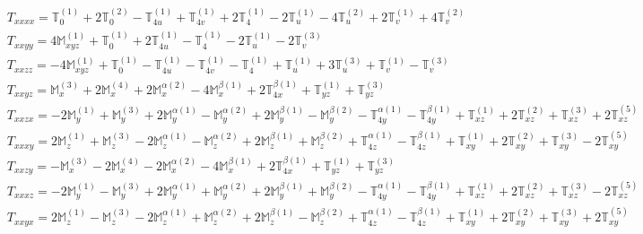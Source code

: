 \documentclass[fleqn,8pt,landscape]{jsarticle}
\begin{document}
\begin{align*}
& T_{xxxx} = \mathbb{T}_{0}^{(1)} + 2 \mathbb{T}_{0}^{(2)} - \mathbb{T}_{4u}^{(1)} + \mathbb{T}_{4v}^{(1)} + 2 \mathbb{T}_{4}^{(1)} - 2 \mathbb{T}_{u}^{(1)} - 4 \mathbb{T}_{u}^{(2)} + 2 \mathbb{T}_{v}^{(1)} + 4 \mathbb{T}_{v}^{(2)} \\
& T_{xxyy} = 4 \mathbb{M}_{xyz}^{(1)} + \mathbb{T}_{0}^{(1)} + 2 \mathbb{T}_{4u}^{(1)} - \mathbb{T}_{4}^{(1)} - 2 \mathbb{T}_{u}^{(1)} - 2 \mathbb{T}_{v}^{(3)} \\
& T_{xxzz} = - 4 \mathbb{M}_{xyz}^{(1)} + \mathbb{T}_{0}^{(1)} - \mathbb{T}_{4u}^{(1)} - \mathbb{T}_{4v}^{(1)} - \mathbb{T}_{4}^{(1)} + \mathbb{T}_{u}^{(1)} + 3 \mathbb{T}_{u}^{(3)} + \mathbb{T}_{v}^{(1)} - \mathbb{T}_{v}^{(3)} \\
& T_{xxyz} = \mathbb{M}_{x}^{(3)} + 2 \mathbb{M}_{x}^{(4)} + 2 \mathbb{M}_{x}^{\alpha(2)} - 4 \mathbb{M}_{x}^{\beta(1)} + 2 \mathbb{T}_{4x}^{\beta(1)} + \mathbb{T}_{yz}^{(1)} + \mathbb{T}_{yz}^{(3)} \\
& T_{xxzx} = - 2 \mathbb{M}_{y}^{(1)} + \mathbb{M}_{y}^{(3)} + 2 \mathbb{M}_{y}^{\alpha(1)} - \mathbb{M}_{y}^{\alpha(2)} + 2 \mathbb{M}_{y}^{\beta(1)} - \mathbb{M}_{y}^{\beta(2)} - \mathbb{T}_{4y}^{\alpha(1)} - \mathbb{T}_{4y}^{\beta(1)} + \mathbb{T}_{xz}^{(1)} + 2 \mathbb{T}_{xz}^{(2)} + \mathbb{T}_{xz}^{(3)} + 2 \mathbb{T}_{xz}^{(5)} \\
& T_{xxxy} = 2 \mathbb{M}_{z}^{(1)} + \mathbb{M}_{z}^{(3)} - 2 \mathbb{M}_{z}^{\alpha(1)} - \mathbb{M}_{z}^{\alpha(2)} + 2 \mathbb{M}_{z}^{\beta(1)} + \mathbb{M}_{z}^{\beta(2)} + \mathbb{T}_{4z}^{\alpha(1)} - \mathbb{T}_{4z}^{\beta(1)} + \mathbb{T}_{xy}^{(1)} + 2 \mathbb{T}_{xy}^{(2)} + \mathbb{T}_{xy}^{(3)} - 2 \mathbb{T}_{xy}^{(5)} \\
& T_{xxzy} = - \mathbb{M}_{x}^{(3)} - 2 \mathbb{M}_{x}^{(4)} - 2 \mathbb{M}_{x}^{\alpha(2)} - 4 \mathbb{M}_{x}^{\beta(1)} + 2 \mathbb{T}_{4x}^{\beta(1)} + \mathbb{T}_{yz}^{(1)} + \mathbb{T}_{yz}^{(3)} \\
& T_{xxxz} = - 2 \mathbb{M}_{y}^{(1)} - \mathbb{M}_{y}^{(3)} + 2 \mathbb{M}_{y}^{\alpha(1)} + \mathbb{M}_{y}^{\alpha(2)} + 2 \mathbb{M}_{y}^{\beta(1)} + \mathbb{M}_{y}^{\beta(2)} - \mathbb{T}_{4y}^{\alpha(1)} - \mathbb{T}_{4y}^{\beta(1)} + \mathbb{T}_{xz}^{(1)} + 2 \mathbb{T}_{xz}^{(2)} + \mathbb{T}_{xz}^{(3)} - 2 \mathbb{T}_{xz}^{(5)} \\
& T_{xxyx} = 2 \mathbb{M}_{z}^{(1)} - \mathbb{M}_{z}^{(3)} - 2 \mathbb{M}_{z}^{\alpha(1)} + \mathbb{M}_{z}^{\alpha(2)} + 2 \mathbb{M}_{z}^{\beta(1)} - \mathbb{M}_{z}^{\beta(2)} + \mathbb{T}_{4z}^{\alpha(1)} - \mathbb{T}_{4z}^{\beta(1)} + \mathbb{T}_{xy}^{(1)} + 2 \mathbb{T}_{xy}^{(2)} + \mathbb{T}_{xy}^{(3)} + 2 \mathbb{T}_{xy}^{(5)} \\

\end{align*}
\end{document}
